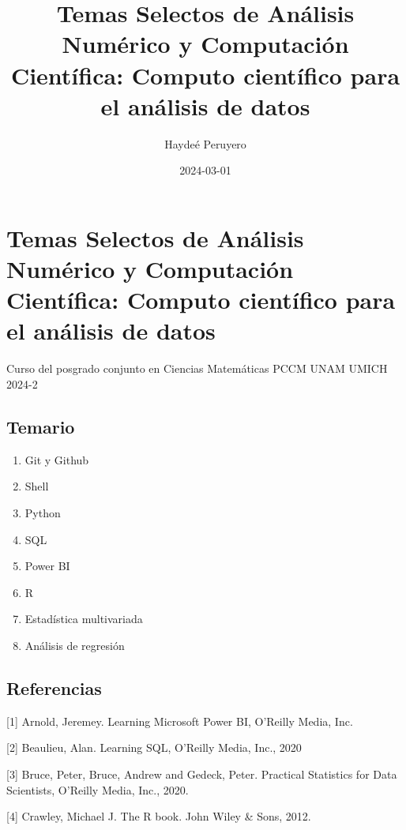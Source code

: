 \documentclass[
]{book}
\title{Temas Selectos de Análisis Numérico y Computación Científica: Computo científico para el análisis de datos}
\author{Haydeé Peruyero}
\date{2024-03-01}
\begin{document}
\maketitle

{
\setcounter{tocdepth}{1}
\tableofcontents
}
\hypertarget{temas-selectos-de-anuxe1lisis-numuxe9rico-y-computaciuxf3n-cientuxedfica-computo-cientuxedfico-para-el-anuxe1lisis-de-datos}{%
\chapter{Temas Selectos de Análisis Numérico y Computación Científica: Computo científico para el análisis de datos}\label{temas-selectos-de-anuxe1lisis-numuxe9rico-y-computaciuxf3n-cientuxedfica-computo-cientuxedfico-para-el-anuxe1lisis-de-datos}}

Curso del posgrado conjunto en Ciencias Matemáticas PCCM UNAM UMICH 2024-2

\hypertarget{temario}{%
\section{Temario}\label{temario}}

\begin{enumerate}
\def\labelenumi{\arabic{enumi}.}
\item
  Git y Github
\item
  Shell
\item
  Python
\item
  SQL
\item
  Power BI
\item
  R
\item
  Estadística multivariada
\item
  Análisis de regresión
\end{enumerate}

\hypertarget{referencias}{%
\section{Referencias}\label{referencias}}

{[}1{]} Arnold, Jeremey. Learning Microsoft Power BI, O'Reilly Media, Inc.

{[}2{]} Beaulieu, Alan. Learning SQL, O'Reilly Media, Inc., 2020

{[}3{]} Bruce, Peter, Bruce, Andrew and Gedeck, Peter. Practical Statistics for Data Scientists, O'Reilly Media, Inc., 2020.

{[}4{]} Crawley, Michael J. The R book. John Wiley \& Sons, 2012.
\end{document}

